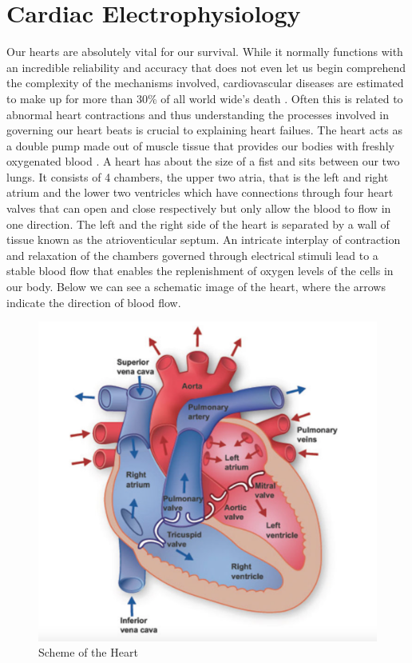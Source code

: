 \documentclass[../draft_1.tex]{subfiles}
\begin{document}
\chapter{Cardiac Electrophysiology}

Our hearts are absolutely vital for our survival. While it normally functions with an incredible reliability and accuracy that does not even let us begin comprehend the complexity of the mechanisms involved, cardiovascular diseases are estimated to make up for more than 30\% of all world wide's death \cite{WHO_statistics}. Often this is related to abnormal heart contractions and thus understanding the processes involved in governing our heart beats is crucial to explaining heart failues. The heart acts as a double pump made out of muscle tissue that provides our bodies with freshly oxygenated blood \cite{deMotuCordis}. A heart has about the size of a fist and sits between our two lungs. It consists of 4 chambers, the upper two atria, that is the left and right atrium and the lower two ventricles which have connections through four heart valves that can open and close respectively but only allow the blood to flow in one direction. The left and the right side of the heart is separated by a wall of tissue known as the atrioventicular septum. An intricate interplay of contraction and relaxation of the chambers governed through electrical stimuli lead to a stable blood flow that enables the replenishment of oxygen levels of the cells in our body. Below we can see a schematic image of the heart, where the arrows indicate the direction of blood flow.

\begin{figure}[ht!]
	\centering
	\includegraphics[scale=0.3]{images/heart_structure_2}
	\caption{Scheme of the Heart \cite{franzone2014mathematical}}
\end{figure}
\end{document}
